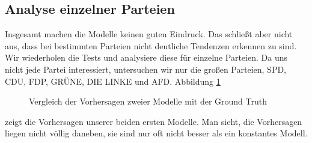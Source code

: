 \documentclass[a4paper,10pt]{scrartcl}
\begin{document}
\subsection{Analyse einzelner Parteien}
Insgesamt machen die Modelle keinen guten Eindruck. Das schließt aber nicht aus, dass bei bestimmten Parteien nicht deutliche Tendenzen erkennen zu sind. Wir wiederholen die Tests und analysiere diese für einzelne Parteien. Da uns nicht jede Partei interessiert, untersuchen wir nur die großen Parteien, SPD, CDU, FDP, GRÜNE, DIE LINKE und AFD. Abbildung \ref{fig:simple_parties} \begin{figure}
	\centering
	\caption{Vergleich der Vorhersagen zweier Modelle mit der Ground Truth}
	\label{fig:simple_parties}\end{figure}  zeigt die Vorhersagen unserer beiden ersten Modelle. Man sieht, die Vorhersagen liegen nicht völlig daneben, sie sind nur oft nicht besser als ein konstantes Modell.
\end{document}
